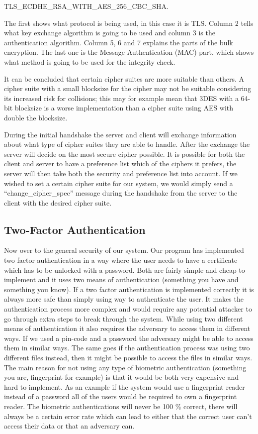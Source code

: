 \documentclass{article}
\begin{document}
TLS\_ECDHE\_RSA\_WITH\_AES\_256\_CBC\_SHA. 

The first shows what protocol is being used, in this case it is TLS.  Column 2 tells what key exchange algorithm is going to be used and column 3 is the authentication algorithm. Column 5, 6 and 7 explains the parts of the bulk encryption. The last one is the Message Authentication (MAC) part, which shows what method is going to be used for the integrity check.

It can be concluded that certain cipher suites are more suitable than others. A cipher suite with a small blocksize for the cipher may not be suitable considering its increased risk for collisions; this may for example mean that 3DES with a 64-bit blocksize is a worse 
implementation than a cipher suite using AES with double the blocksize. 

During the initial handshake the server and client will exchange information about what type of cipher suites they are able to handle. After the exchange the server will decide on the most secure cipher possible. It is possible for both the client and server to have a preference list which of the ciphers it prefers, the server will then take both the security and preference list into account. If we wished to set a certain cipher suite for our system, we would simply send a “change\_cipher\_spec” message during the handshake from the server to the client with the desired cipher suite.

\subsection*{Two-Factor Authentication}

Now over to the general security of our system. Our program has implemented two factor authentication in a way where the user needs to have a certificate which has to be unlocked with a password. Both are fairly simple and cheap to implement and it uses two means of authentication (something you have and something you know). If a two factor authentication is implemented correctly it is always more safe than simply using way to authenticate the user. It makes the authentication process more complex and would require any potential attacker to go through extra steps to break through the system. While using two different means of authentication it also requires the adversary to access them in different ways. If we used a pin-code and a password the adversary might be able to access them in similar ways. The same goes if the authentication process was using two different files instead, then it might be possible to access the files in similar ways. The main reason for not using any type of biometric authentication (something you are, fingerprint for example) is that it would be both very expensive and hard to implement. As an example if the system would use a fingerprint reader instead of a password all of the users would be required to own a fingerprint reader. The biometric authentications will never be 100 \% correct, there will always be a certain error rate which can lead to either that the correct user can’t access their data or that an adversary can\cite[p.111]{stalbrown}.
\end{document}
